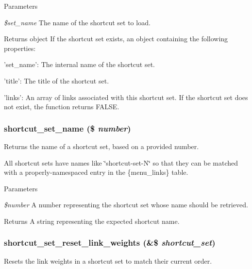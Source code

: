 \begin{DoxyParams}{Parameters}
\item[{\em \$set\_\-name}]The name of the shortcut set to load.\end{DoxyParams}
\begin{DoxyReturn}{Returns}
object If the shortcut set exists, an object containing the following properties:
\begin{DoxyItemize}
\item 'set\_\-name': The internal name of the shortcut set.
\item 'title': The title of the shortcut set.
\item 'links': An array of links associated with this shortcut set. If the shortcut set does not exist, the function returns FALSE. 
\end{DoxyItemize}
\end{DoxyReturn}
\hypertarget{shortcut_8module_a2d5740d822f16b0a0fdf942f5bef64f7}{
\subsubsection[{shortcut\_\-set\_\-name}]{\setlength{\rightskip}{0pt plus 5cm}shortcut\_\-set\_\-name (\$ {\em number})}}
\label{shortcut_8module_a2d5740d822f16b0a0fdf942f5bef64f7}
Returns the name of a shortcut set, based on a provided number.

All shortcut sets have names like \char`\"{}shortcut-\/set-\/N\char`\"{} so that they can be matched with a properly-\/namespaced entry in the \{menu\_\-links\} table.


\begin{DoxyParams}{Parameters}
\item[{\em \$number}]A number representing the shortcut set whose name should be retrieved.\end{DoxyParams}
\begin{DoxyReturn}{Returns}
A string representing the expected shortcut name. 
\end{DoxyReturn}
\hypertarget{shortcut_8module_ab5c6a0dcff160e3ed51f7b1a508ce008}{
\subsubsection[{shortcut\_\-set\_\-reset\_\-link\_\-weights}]{\setlength{\rightskip}{0pt plus 5cm}shortcut\_\-set\_\-reset\_\-link\_\-weights (\&\$ {\em shortcut\_\-set})}}
\label{shortcut_8module_ab5c6a0dcff160e3ed51f7b1a508ce008}
Resets the link weights in a shortcut set to match their current order.

